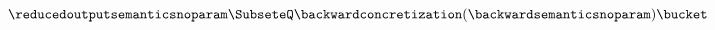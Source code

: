 \[\reducedoutputsemanticsnoparam \SubseteQ \backwardconcretization(\backwardsemanticsnoparam)\bucket\]
